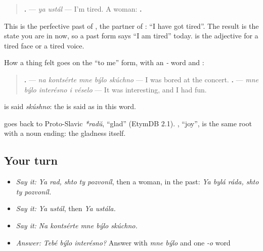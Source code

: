 \begin{grammarlens}[title={Grammar Lens: \ru{я} \ru{устал}, I'm tired}]
\begin{quote}
\textbf{ .} — \emph{ya ustál} — I'm tired. A woman: \textbf{ .}
\end{quote}

This is the perfective past of \emph{}, the partner of \emph{}: \textquotedblleft{}I have got tired\textquotedblright{}. The result is the state you are in now, so a past form says \textquotedblleft{}I am tired\textquotedblright{} today. \emph{} is the adjective for a tired face or a tired voice.
\end{grammarlens}

\begin{grammarlens}[title={Grammar Lens: \ru{мне} \ru{было} \ru{скучно}}]
How a thing felt goes on the \textquotedblleft{}to me\textquotedblright{} form, with an \emph{-} word and \textbf{}:

\begin{quote}
\textbf{    .} — \emph{na kontsérte mne býlo skúchno} — I was bored at the concert. \textbf{    .} — \emph{mne býlo interésno i véselo} — It was interesting, and I had fun.
\end{quote}

\emph{} is said \emph{skúshno}: the \emph{} is said as \emph{} in this word.
\end{grammarlens}

\begin{cousinweb}
\textbf{} goes back to Proto-Slavic \emph{*radŭ}, \textquotedblleft{}glad\textquotedblright{} (EtymDB 2.1). \textbf{}, \textquotedblleft{}joy\textquotedblright{}, is the same root with a noun ending: the gladness itself.
\end{cousinweb}

\subsection*{Your turn}
\begin{itemize}
\raggedright
  \item \emph{Say it:} \emph{Ya rad, shto ty pozvoníl}, then a woman, in the past: \emph{Ya bylá ráda, shto ty pozvoníl.}
  \item \emph{Say it:} \emph{Ya ustál}, then \emph{Ya ustála.}
  \item \emph{Say it:} \emph{Na kontsérte mne býlo skúchno.}
  \item \emph{Answer:} \emph{Tebé býlo interésno?} Answer with \emph{mne býlo} and one \emph{-o} word
\end{itemize}

